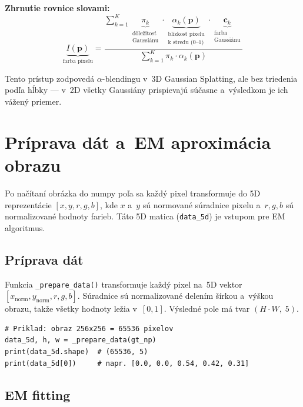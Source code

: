 \documentclass[a4paper,11pt]{article}
\begin{document}
\medskip
\noindent\textbf{Zhrnutie rovnice slovami:}
$$
\underbrace{I(\mathbf{p})}_{\text{farba pixelu}}
= \frac{
  \sum_{k=1}^{K}
  \underbrace{\pi_k}_{\substack{\text{dôležitosť}\\\text{Gaussiánu}}}
  \cdot
  \underbrace{\alpha_k(\mathbf{p})}_{\substack{\text{blízkosť pixelu}\\\text{k~stredu (0--1)}}}
  \cdot
  \underbrace{\mathbf{c}_k}_{\substack{\text{farba}\\\text{Gaussiánu}}}
}{
  \sum_{k=1}^{K} \pi_k \cdot \alpha_k(\mathbf{p})
}
$$

Tento prístup zodpovedá $\alpha$-blendingu v~3D Gaussian Splatting,
ale bez triedenia podľa hĺbky --- v~2D všetky Gaussiány prispievajú
súčasne a~výsledkom je ich vážený priemer.

\section{Príprava dát a~EM aproximácia obrazu}
\label{sec:fitting}

Po načítaní obrázka do numpy poľa sa každý pixel transformuje do 5D
reprezentácie $[x, y, r, g, b]$, kde $x$ a~$y$ sú normované súradnice
pixelu a~$r, g, b$ sú normalizované hodnoty farieb.  Táto 5D matica
(\texttt{data\_5d}) je vstupom pre EM algoritmus.

\subsection{Príprava dát}

Funkcia \texttt{\_prepare\_data()} transformuje každý pixel na~5D vektor
$[x_{\mathrm{norm}}, y_{\mathrm{norm}}, r, g, b]$.  Súradnice sú normalizované
delením šírkou a~výškou obrazu, takže všetky hodnoty ležia v~$[0,1]$.
Výsledné pole má tvar $(H \cdot W,\; 5)$.

\begin{lstlisting}
# Priklad: obraz 256x256 = 65536 pixelov
data_5d, h, w = _prepare_data(gt_np)
print(data_5d.shape)  # (65536, 5)
print(data_5d[0])     # napr. [0.0, 0.0, 0.54, 0.42, 0.31]
\end{lstlisting}

\subsection{EM fitting}
\end{document}
